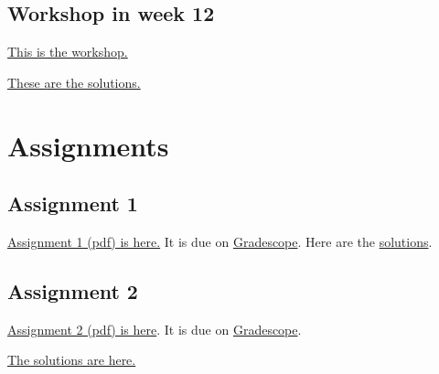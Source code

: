\documentclass{amsart}
\begin{document}
\subsection{Workshop in week 12}
\label{sec:org607e316}
\href{https://canvas.anu.edu.au/files/1275923/download?download\_frd=1\&verifier=rrx48Ktcal3nY1xxioKjgRGhHONugIgrRtREjAfH}{This is the workshop.}

\href{https://canvas.anu.edu.au/files/1317954/download?download\_frd=1\&verifier=bydsW41CpSYPc047AAgkrt16kXBTflxSqV9FEVDV}{These are the solutions.}
\section{Assignments}
\label{sec:orgf8a5a9a}
\subsection{Assignment 1}
\label{sec:orge0f94ed}
\href{https://canvas.anu.edu.au/files/709890/download?download\_frd=1\&verifier=RmLFJ3uhBGI4m8RlXGPr2BhC8ejjpGmaz3ZypFZx}{Assignment 1 (pdf) is here.}  It is due on \href{https://www.gradescope.com/courses/1070433}{Gradescope}.
Here are the \href{https://canvas.anu.edu.au/files/733279/download?download\_frd=1\&verifier=oqhBYwaOkWepdASEvBKakyzbq7Aw7Sgglbf7JZK6}{solutions}.
\subsection{Assignment 2}
\label{sec:orgd13af49}
\href{https://canvas.anu.edu.au/files/718708/download?download\_frd=1\&verifier=JeNveCoSBY6ztZLjQGgjaNK46uhhilohTM9MpozY}{Assignment 2 (pdf) is here}.  It is due on \href{https://www.gradescope.com/courses/1070433}{Gradescope}.

\href{https://canvas.anu.edu.au/files/744924/download?download\_frd=1\&verifier=rYYaIEtdfo4AveQUNF5b9ns6tPAxDV1YUtnt9Ss0}{The solutions are here.}
\end{document}
